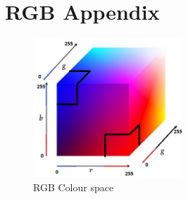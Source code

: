 \section{RGB Appendix}
\label{apx:rgb}

\begin{figure}[h!]
  \caption{RGB Colour space}
  \label{vis4}
  \centering
    \includegraphics[width=0.5\textwidth]{RGB_Space.jpg}
\end{figure}
